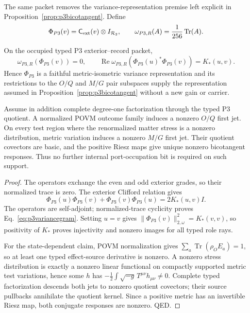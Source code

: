 The same packet removes the variance-representation premise left explicit in
Proposition~\ref{prop:p3bicotangent}.  Define
\begin{equation}
 \Phi_{P3}(v)=\mathsf C_{\rm ext}(v)\otimes I_{\mathcal R_2},
 \qquad
 \omega_{P3,R}(A)=\frac{1}{256}\operatorname{Tr}(A).
 \label{eq:p3variancerepresentation}
\end{equation}

\begin{proposition}
\label{prop:p3portoccupation}
On the occupied typed P3 exterior--record packet,
\begin{equation}
 \omega_{P3,R}(\Phi_{P3}(v))=0,
 \qquad
 \operatorname{Re}\omega_{P3,R}
 \left(\Phi_{P3}(u)^*\Phi_{P3}(v)\right)=K_*(u,v).
 \label{eq:p3variancegram}
\end{equation}
Hence $\Phi_{P3}$ is a faithful metric-isometric variance representation and
its restrictions to the $O/Q$ and $M/G$ pair subspaces supply the
representation assumed in Proposition~\ref{prop:p3bicotangent} without a new
gain or carrier.

Assume in addition complete degree-one factorization through the typed P3
quotient.  A normalized POVM outcome family induces a nonzero $O/Q$ first
jet.  On every test region where the renormalized matter stress is a nonzero
distribution, metric variation induces a nonzero $M/G$ first jet.  Their
quotient covectors are basic, and the positive Riesz maps give unique nonzero
bicotangent responses.  Thus no further internal port-occupation bit is
required on such support.
\end{proposition}

\begin{proof}
The operators exchange the even and odd exterior grades, so their normalized
trace is zero.  The exterior Clifford relation gives
\begin{equation}
 \Phi_{P3}(u)\Phi_{P3}(v)+\Phi_{P3}(v)\Phi_{P3}(u)
 =2K_*(u,v)I.
\end{equation}
The operators are self-adjoint; normalized-trace cyclicity proves
Eq.~\eqref{eq:p3variancegram}.  Setting $u=v$ gives
$\|\Phi_{P3}(v)\|_{2,\omega}^2=K_*(v,v)$, so positivity of $K_*$ proves
injectivity and nonzero images for all typed role rays.

For the state-dependent claim, POVM normalization gives
$\sum_a\operatorname{Tr}(\rho_OE_a)=1$, so at least one typed effect-source
derivative is nonzero.  A nonzero stress distribution is exactly a nonzero
linear functional on compactly supported metric test variations, hence some
$h$ has
$-\frac12\int\sqrt{-g}\,T^{\mu\nu}h_{\mu\nu}\ne0$.
Complete typed factorization descends both jets to nonzero quotient
covectors; their source pullbacks annihilate the quotient kernel.  Since a
positive metric has an invertible Riesz map, both conjugate responses are
nonzero. QED.
\end{proof}

